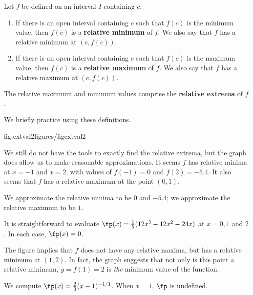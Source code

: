 %
{Let $f$ be defined on an interval $I$ containing $c$. 
\begin{enumerate}
	\item	If there is an open interval containing $c$ such that $f(c)$ is the minimum value, then $f(c)$ is a \textbf{relative minimum} of $f$. We also say that $f$ has a relative minimum at $(c,f(c))$.
	\item	If there is an open interval containing $c$ such that $f(c)$ is the maximum value, then $f(c)$ is a \textbf{relative maximum} of $f$. We also say that $f$ has a relative maximum at $(c,f(c))$.
\end{enumerate}

The relative maximum and minimum values comprise the \textbf{relative extrema} of $f$.}

		
We briefly practice using these definitions.

%
{fig:extval2}{figures/figextval2}

{We still do not have the tools to exactly find the relative extrema, but the graph does allow us to make reasonable approximations. It seems $f$ has relative minima at $x=-1$ and $x=2$, with values of $f(-1)=0$ and $f(2) = -5.4$. It also seems that $f$ has a relative maximum at the point $(0,1)$. 

We approximate the relative minima to be $0$ and $-5.4$; we approximate the relative maximum to be $1$.

It is straightforward to evaluate $\fp(x) =\frac15(12x^3-12x^2-24x)$ at $x=0, 1$ and $2$. In each case, $\fp(x) = 0$.}

{The figure implies that $f$ does not have any relative maxima, but has a relative minimum at $(1,2)$. In fact, the graph suggests that not only is this point a relative minimum, $y=f(1)=2$ is \textit{the} minimum value of the function.

We compute $\fp(x) = \frac23(x-1)^{-1/3}$. When $x=1$, $\fp$ is undefined.}

